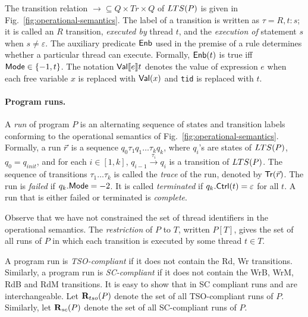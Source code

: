 The transition relation $\rightarrow\subseteq Q\times Tr\times Q$ of $\mathnormal{LTS}(P)$ is given in Fig.~\ref{fig:operational-semantics}.
The label of a transition is written as $\tau=R,t:s$; it is called an $R$ transition, {\em executed by} thread $t$, and the {\em execution of} statement $s$ when $s\neq \varepsilon$.
The auxiliary predicate $\mathsf{Enb}$ used in the premise of a rule determines whether a particular thread can execute.
Formally, $\mathsf{Enb}(t)$ is true iff $\mathsf{Mode}\in\{-1,t\}$. 
The notation $\mathsf{Val} \llbracket e \rrbracket t$ denotes the value of expression $e$ when each free variable $x$ is replaced with $\mathsf{Val}(x)$ and {\tt tid} is replaced with $t$.


\paragraph{Program runs.}
A {\em run} of program $P$ is an alternating sequence of states and transition labels conforming to the operational semantics of Fig.~\ref{fig:operational-semantics}.
Formally, a run $\vec{r}$ is a sequence $q_0\tau_1q_1\ldots \tau_kq_k$, where $q_i$'s are states of $\mathnormal{LTS}(P)$, $q_0=q_{init}$, and for each $i\in[1,k]$, $q_{i-1}\xrightarrow{\tau_i}q_i$ is a transition of $\mathnormal{LTS}(P)$.
The sequence of transitions $\tau_1\ldots \tau_k$ is called the {\em trace} of the run, denoted by $\mathsf{Tr}(\vec{r})$.
The run is {\em failed} if $q_k.\mathsf{Mode}=-2$.
It is called {\em terminated} if $q_k.\mathsf{Ctrl}(t)=\varepsilon$ for all $t$.
A run that is either failed or terminated is {\em complete}.

Observe that we have not constrained the set of thread identifiers in the operational semantics.
The {\em restriction} of $P$ to $T$, written $P[T]$, gives the set of all runs of $P$ in which each transition is executed by some thread $t\in T$. 

A program run is {\em TSO-compliant} if it does not contain the {\sc \small Rd, Wr} transitions.
Similarly, a program run is {\em SC-compliant} if it does not contain the {\sc \small WrB, WrM, RdB} and {\sc \small RdM} transitions.
It is easy to show that in SC compliant runs {\alifence} and {\aliskip} are interchangeable. 
Let $\mathbf{R}_{tso}(P)$ denote the set of all TSO-compliant runs of $P$.
Similarly, let $\mathbf{R}_{sc}(P)$ denote the set of all SC-compliant runs of $P$.



